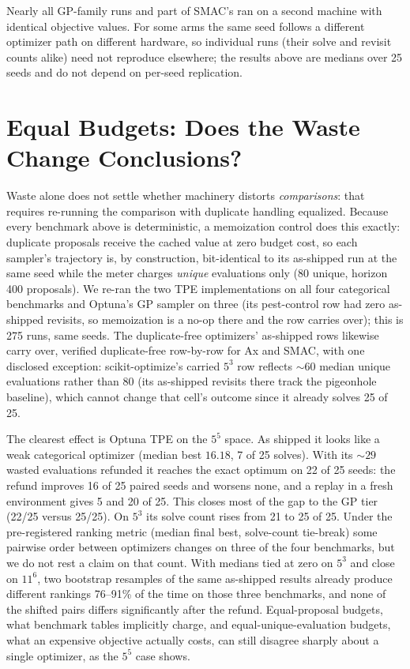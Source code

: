 \documentclass[%
 aip,
 amsmath,amssymb,
 floatfix,
 reprint,%
]{revtex4-1}
\begin{document}
Nearly all GP-family runs and part of SMAC's ran on a second machine
with identical objective values. For some arms the same seed follows a
different optimizer path on different hardware, so individual runs
(their solve and revisit counts alike) need not reproduce elsewhere;
the results above are medians over 25 seeds and do not depend on
per-seed replication.

\section{Equal Budgets: Does the Waste Change Conclusions?}
\label{sec:equalized}

Waste alone does not settle whether machinery distorts
\emph{comparisons}: that requires re-running the comparison with
duplicate handling equalized. Because every benchmark above is
deterministic, a memoization control does this exactly: duplicate
proposals receive the cached value at zero budget cost, so each
sampler's trajectory is, by construction, bit-identical to its
as-shipped run at the same seed while the meter charges \emph{unique}
evaluations only (80 unique, horizon 400 proposals). We re-ran the two
TPE implementations on all four categorical benchmarks and Optuna's GP
sampler on three (its pest-control row had zero as-shipped revisits, so
memoization is a no-op there and the row carries over); this is 275 runs,
same seeds. The duplicate-free optimizers' as-shipped rows likewise carry
over, verified duplicate-free row-by-row for Ax and SMAC, with one
disclosed exception: scikit-optimize's carried $5^3$ row reflects
${\sim}60$ median unique evaluations rather than 80 (its as-shipped
revisits there track the pigeonhole baseline), which cannot change that
cell's outcome since it already solves 25 of 25.

The clearest effect is Optuna TPE on the $5^5$ space. As shipped it looks
like a weak categorical optimizer (median best $16.18$, 7 of 25 solves).
With its ${\sim}29$ wasted evaluations refunded it reaches the exact
optimum on 22 of 25 seeds: the refund improves 16 of 25 paired seeds and
worsens none, and a replay in a fresh environment gives 5 and 20 of 25.
This closes most of the gap to the GP tier (22/25 versus 25/25). On $5^3$
its solve count rises from 21 to 25 of 25. Under the pre-registered
ranking metric (median final best, solve-count tie-break) some pairwise
order between optimizers changes on three of the four benchmarks, but we
do not rest a claim on that count. With medians tied at zero on $5^3$ and
close on $11^6$, two bootstrap resamples of the same as-shipped results
already produce different rankings 76--91\% of the time on those three
benchmarks, and none of the shifted pairs differs significantly after the
refund. Equal-proposal budgets, what benchmark tables implicitly charge,
and equal-unique-evaluation budgets, what an expensive objective actually
costs, can still disagree sharply about a single optimizer, as the $5^5$
case shows.
\end{document}
